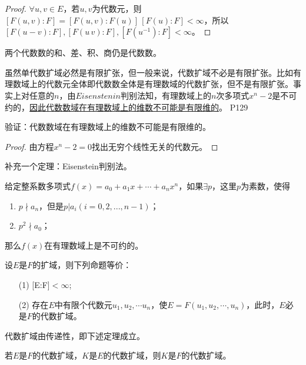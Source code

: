 \begin{proof}
	$\forall u,v\in E$，若$u,v$为代数元，则$[F(u,v):F]=[F(u,v):F(u)]\,[F(u):F]<\infty$，所以$[F(u-v):F],[F(u\,v):F],[F(u^{-1}):F]<\infty$。
\end{proof}

\begin{corollary}
	两个代数数的和、差、积、商仍是代数数。
\end{corollary}

\original
{
	虽然单代数扩域必然是有限扩张，但一般来说，代数扩域不必是有限扩张。比如有理数域上的代数元全体即代数数全体是有理数域的代数扩张，但不是有限扩张。事实上对任意的$n$，由$Eisenstenin$判别法知，有理数域上的$n$次多项式$x^{n}-2$是不可约的，\uline{因此代数数域在有理数域上的维数不可能是有限维的}。
}
{P129}

\begin{proposition}
	验证：代数数域在有理数域上的维数不可能是有限维的。
\end{proposition}

\begin{proof}
	由方程$x^{n}-2=0$找出无穷个线性无关的代数元。
\end{proof}

\begin{remark}
	补充一个定理：Eisenstein判别法。
	\par
	给定整系数多项式$f(x)=a_{0}+a_{1}x+\cdots+a_{n}x^{n}$，如果$\exists p$，这里$p$为素数，使得
	\begin{enumerate}
		\item $p\nmid a_{n}$，但是$p\big| a_{i}(i=0,2,...,n-1)$；
		\item $p^{2}\nmid a_{0}$；
	\end{enumerate}
	那么$f(x)$在有理数域上是不可约的。
\end{remark}



\begin{theorem}
	设$E$是$F$的扩域，则下列命题等价：
	\begin{enumerate}
		\item[(1)] [E:F]$<\infty$;
		\item[(2)] 存在$E$中有限个代数元$u_{1},u_{2},\cdots u_{n}$，使$E=F(u_{1},u_{2},\cdots,u_{n})$，此时，$E$必是$F$的代数扩域。
	\end{enumerate}
\end{theorem}


代数扩域由传递性，即下述定理成立。
\begin{theorem}\label{YMSthe040203}
	若$E$是$F$的代数扩域，$K$是$E$的代数扩域，则$K$是$F$的代数扩域。
\end{theorem}

